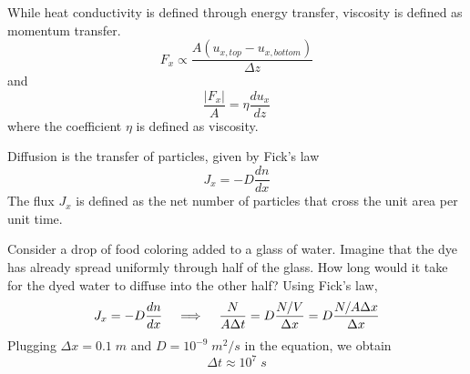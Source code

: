 \vspace{2ex}
\begin{defi}
While heat conductivity is defined through energy transfer, viscosity is defined as momentum transfer.
\[F_{x}\propto \dfrac{A(u_{x,top}-u_{x,bottom})}{\Delta z}\]
and
\[\dfrac{|F_{x}|}{A}=\eta \dfrac{d u_{x}}{d z} \]
where the coefficient $\eta $ is defined as viscosity.
\end{defi}
\vspace{2ex}
\begin{defi}
 Diffusion is the transfer of particles, given by Fick's  law
 \[J_{x}=-D\dfrac{d n}{d x} \]
 The flux $J_{x}$ is defined as the net number of particles that cross the unit area per unit time.
\end{defi}
\vspace{2ex}
\begin{ex}
Consider a drop of food coloring added to a glass of water. Imagine that the dye has already spread uniformly through half of the glass. How long would it take for the dyed water to diffuse into the other half? Using Fick's law, 
\[J_{x}=-D\dfrac{d n}{d x}\hspace{2ex}\implies \hspace{2ex}\dfrac{N}{A\Delta t}=D\dfrac{N/V}{\Delta x}=D\dfrac{N/A\Delta x}{\Delta x} \]
Plugging $\Delta x=0.1\;m$ and $D=10^{-9}\;m^2/s$ in the equation, we obtain
\[\Delta t\approx 10^{7}\;s\]
\end{ex}
\vspace{2ex}

